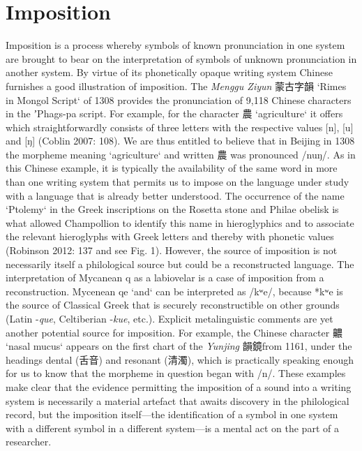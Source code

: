 \section{Imposition}
Imposition is a process whereby symbols of known pronunciation in one system are brought to bear on the interpretation of symbols of unknown pronunciation in another system. By virtue of its phonetically opaque writing system Chinese furnishes a good illustration of imposition. The \textit{Menggu Ziyun} 蒙古字韻 `Rimes in Mongol Script` of 1308 provides the pronunciation of 9,118 Chinese characters in the ʼPhags-pa script. For example, for the character 農 `agriculture` it offers  which straightforwardly consists of three letters with the respective values [n], [u] and [ŋ] (Coblin 2007: 108). We are thus entitled to believe that in Beijing in 1308 the morpheme meaning `agriculture` and written 農 was pronounced /nuŋ/. As in this Chinese example, it is typically the availability of the same word in more than one writing system that permits us to impose on the language under study with a language that is already better understood. The occurrence of the name `Ptolemy` in the Greek inscriptions on the Rosetta stone and Philae obelisk is what allowed Champollion to identify this name in hieroglyphics and to associate the relevant hieroglyphs with Greek letters and thereby with phonetic values (Robinson 2012: 137 and see Fig. 1). However, the source of imposition is not necessarily itself a philological source but could be a reconstructed language. The interpretation of Mycanean q as a labiovelar is a case of imposition from a reconstruction. Mycenean qe `and` can be interpreted as /kʷe/, because *kʷe is the source of Classical Greek {} that is securely reconstructible on other grounds (Latin -\textit{que}, Celtiberian -\textit{kue}, etc.). Explicit metalinguistic comments are yet another potential source for imposition. For example, the Chinese character 齈 `nasal mucus` appears on the first chart of the \textit{Yunjing} 韻鏡from 1161, under the headings dental (舌音) and resonant (清濁), which is practically speaking enough for us to know that the morpheme in question began with /n/. These examples make clear that the evidence permitting the imposition of a sound into a writing system is necessarily a material artefact that awaits discovery in the philological record, but the imposition itself—the identification of a symbol in one system with a different symbol in a different system—is a mental act on the part of a researcher.  

